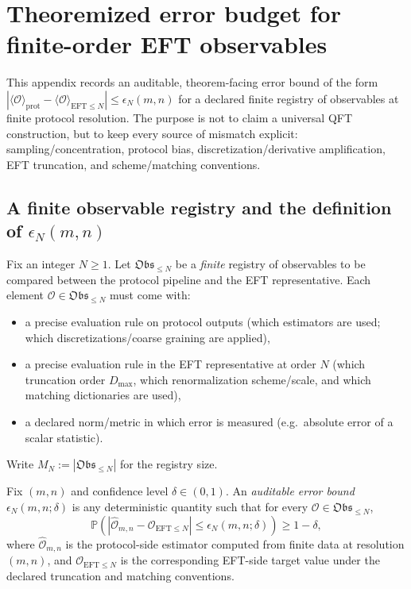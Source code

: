 \section{Theoremized error budget for finite-order EFT observables}
\label{app:eft_error_bounds}

This appendix records an auditable, theorem-facing error bound of the form
$
|\langle\mathcal{O}\rangle_{\mathrm{prot}}-\langle\mathcal{O}\rangle_{\mathrm{EFT}\le N}|
\le \epsilon_N(m,n)
$
for a declared finite registry of observables at finite protocol resolution.
The purpose is not to claim a universal QFT construction, but to keep every source of mismatch explicit:
sampling/concentration, protocol bias, discretization/derivative amplification, EFT truncation, and scheme/matching conventions.

\subsection{A finite observable registry and the definition of $\epsilon_N(m,n)$}

\begin{definition}\label{def:obs_registry_finite}
\AuditTag Fix an integer $N\ge 1$.
Let $\mathfrak{Obs}_{\le N}$ be a \emph{finite} registry of observables to be compared between the protocol pipeline and the EFT representative.
Each element $\mathcal{O}\in\mathfrak{Obs}_{\le N}$ must come with:
\begin{itemize}
\item a precise evaluation rule on protocol outputs (which estimators are used; which discretizations/coarse graining are applied),
\item a precise evaluation rule in the EFT representative at order $N$ (which truncation order $D_{\max}$, which renormalization scheme/scale, and which matching dictionaries are used),
\item a declared norm/metric in which error is measured (e.g.\ absolute error of a scalar statistic).
\end{itemize}
Write $M_N:=|\mathfrak{Obs}_{\le N}|$ for the registry size.
\end{definition}

\begin{definition}\label{def:epsilon_N_mn}
\MathTag Fix $(m,n)$ and confidence level $\delta\in(0,1)$.
An \emph{auditable error bound} $\epsilon_N(m,n;\delta)$ is any deterministic quantity such that
for every $\mathcal{O}\in\mathfrak{Obs}_{\le N}$,
\[
\mathbb{P}\!\left(\left|\widehat{\mathcal{O}}_{m,n}-\mathcal{O}_{\mathrm{EFT}\le N}\right|
\le \epsilon_N(m,n;\delta)\right)\ge 1-\delta,
\]
where $\widehat{\mathcal{O}}_{m,n}$ is the protocol-side estimator computed from finite data at resolution $(m,n)$, and $\mathcal{O}_{\mathrm{EFT}\le N}$ is the corresponding EFT-side target value under the declared truncation and matching conventions.
\end{definition}

